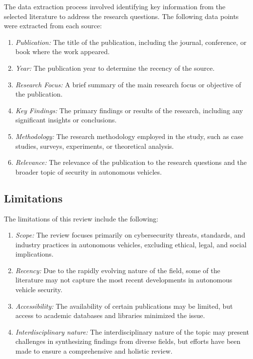 The data extraction process involved identifying key information from the selected literature to address the research questions.
The following data points were extracted from each source:
\begin{enumerate}
    \item \textit{Publication:} The title of the publication, including the journal, conference, or book where the work appeared.
    \item \textit{Year:} The publication year to determine the recency of the source.
    \item \textit{Research Focus:} A brief summary of the main research focus or objective of the publication.
    \item \textit{Key Findings:} The primary findings or results of the research, including any significant insights or conclusions.
    \item \textit{Methodology:} The research methodology employed in the study, such as case studies, surveys, experiments, or theoretical analysis.
    \item \textit{Relevance:} The relevance of the publication to the research questions and the broader topic of security in autonomous vehicles.
\end{enumerate}

\subsection{Limitations}\label{subsec:limitations}

The limitations of this review include the following:
\begin{enumerate}
    \item \textit{Scope:} The review focuses primarily on cybersecurity threats, standards, and industry practices in autonomous vehicles, excluding ethical, legal, and social implications.
    \item \textit{Recency:} Due to the rapidly evolving nature of the field, some of the literature may not capture the most recent developments in autonomous vehicle security.
    \item \textit{Accessibility:} The availability of certain publications may be limited, but access to academic databases and libraries minimized the issue.
    \item \textit{Interdisciplinary nature:} The interdisciplinary nature of the topic may present challenges in synthesizing findings from diverse fields, but efforts have been made to ensure a comprehensive and holistic review.
\end{enumerate}

\newpage
